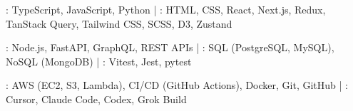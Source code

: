 : TypeScript, JavaScript, Python | : HTML, CSS, React, Next.js, Redux, TanStack Query, Tailwind CSS, SCSS, D3, Zustand\par
{}: Node.js, FastAPI, GraphQL, REST APIs | : SQL (PostgreSQL, MySQL), NoSQL (MongoDB) | : Vitest, Jest, pytest\par
{}: AWS (EC2, S3, Lambda), CI/CD (GitHub Actions), Docker, Git, GitHub | : Cursor, Claude Code, Codex, Grok Build\par

